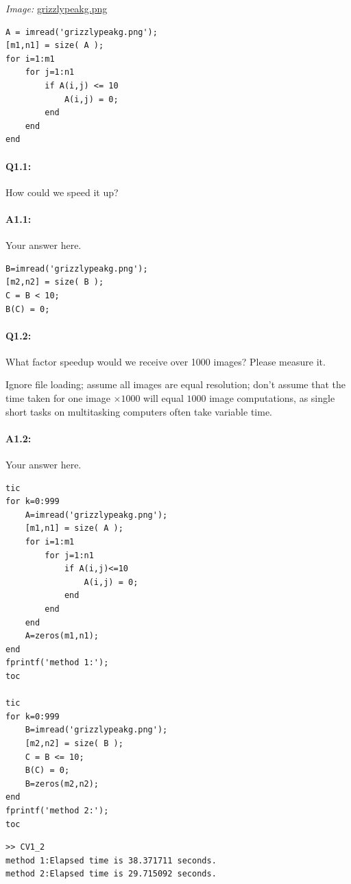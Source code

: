\documentclass[11pt]{article}
\begin{document}
\emph{Image:} \href{grizzlypeakg.png}{grizzlypeakg.png}

\begin{lstlisting}[style=Matlab-editor]
A = imread('grizzlypeakg.png');
[m1,n1] = size( A );
for i=1:m1
    for j=1:n1
        if A(i,j) <= 10
            A(i,j) = 0;
        end
    end
end
\end{lstlisting}

\paragraph{Q1.1:} How could we speed it up?

\paragraph{A1.1:} Your answer here.

\begin{lstlisting}[style=Matlab-editor]
B=imread('grizzlypeakg.png');
[m2,n2] = size( B );
C = B < 10;
B(C) = 0;
\end{lstlisting}


\pagebreak
\paragraph{Q1.2:} What factor speedup would we receive over 1000 images? Please measure it.

Ignore file loading; assume all images are equal resolution; don't assume that the time taken for one image $\times1000$ will equal $1000$ image computations, as single short tasks on multitasking computers often take variable time.

\paragraph{A1.2:} Your answer here.
\begin{lstlisting}[style=Matlab-editor]
tic
for k=0:999
    A=imread('grizzlypeakg.png');
    [m1,n1] = size( A );
    for i=1:m1
        for j=1:n1
            if A(i,j)<=10
                A(i,j) = 0;
            end
        end
    end
    A=zeros(m1,n1);
end
fprintf('method 1:');
toc

tic
for k=0:999
    B=imread('grizzlypeakg.png');
    [m2,n2] = size( B );
    C = B <= 10;
    B(C) = 0;
    B=zeros(m2,n2);
end
fprintf('method 2:');
toc
\end{lstlisting}
\begin{verbatim}
>> CV1_2
method 1:Elapsed time is 38.371711 seconds.
method 2:Elapsed time is 29.715092 seconds.
\end{verbatim}
\end{document}
